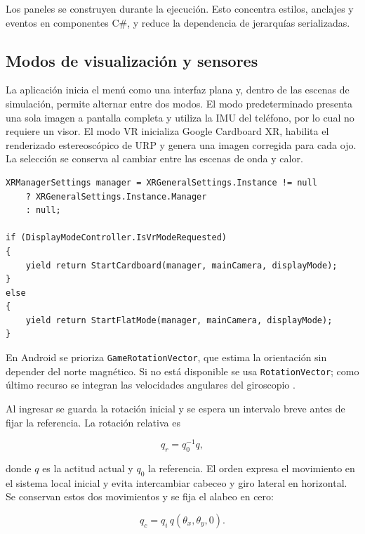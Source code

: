 Los paneles se construyen durante la ejecución. Esto concentra estilos, anclajes y
eventos en componentes C\#, y reduce la dependencia de jerarquías serializadas.

\subsection{Modos de visualización y sensores}

La aplicación inicia el menú como una interfaz plana y, dentro de las escenas de
simulación, permite alternar entre dos modos. El modo predeterminado presenta una sola
imagen a pantalla completa y utiliza la IMU del teléfono, por lo cual no requiere un
visor. El modo VR inicializa Google Cardboard XR, habilita el renderizado estereoscópico
de URP y genera una imagen corregida para cada ojo. La selección se conserva al cambiar
entre las escenas de onda y calor.

\begin{lstlisting}[style=csharp, caption={Selección del modo de visualización.}]
XRManagerSettings manager = XRGeneralSettings.Instance != null
    ? XRGeneralSettings.Instance.Manager
    : null;

if (DisplayModeController.IsVrModeRequested)
{
    yield return StartCardboard(manager, mainCamera, displayMode);
}
else
{
    yield return StartFlatMode(manager, mainCamera, displayMode);
}
\end{lstlisting}

En Android se prioriza \texttt{GameRotationVector}, que estima la orientación sin
depender del norte magnético. Si no está disponible se usa \texttt{RotationVector};
como último recurso se integran las velocidades angulares del giroscopio
\cite{androidSensors}.

Al ingresar se guarda la rotación inicial y se espera un intervalo breve antes de
fijar la referencia. La rotación relativa es

\begin{equation}
q_r=q_0^{-1}q,
\end{equation}

donde $q$ es la actitud actual y $q_0$ la referencia. El orden expresa el movimiento
en el sistema local inicial y evita intercambiar cabeceo y giro lateral en horizontal.
Se conservan estos dos movimientos y se fija el alabeo en cero:

\begin{equation}
q_c=q_i\,q(\theta_x,\theta_y,0).
\end{equation}

